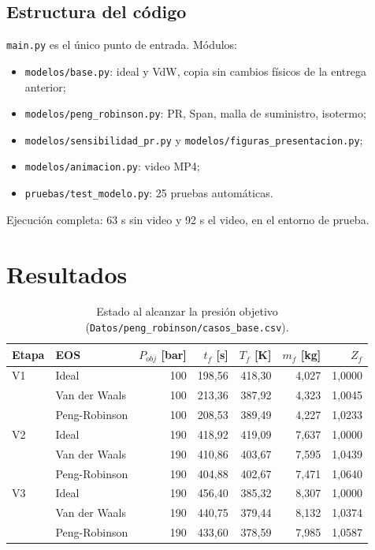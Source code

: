 \documentclass[11pt]{article}
\begin{document}
\subsection{Estructura del código}
\texttt{main.py} es el único punto de entrada. Módulos:
\begin{itemize}
\item \texttt{modelos/base.py}: ideal y VdW, copia sin cambios físicos de la entrega anterior;
\item \texttt{modelos/peng\_robinson.py}: PR, Span, malla de suministro, isotermo;
\item \texttt{modelos/sensibilidad\_pr.py} y \texttt{modelos/figuras\_presentacion.py};
\item \texttt{modelos/animacion.py}: video MP4;
\item \texttt{pruebas/test\_modelo.py}: 25 pruebas automáticas.
\end{itemize}
Ejecución completa: 63 s sin video y 92 s el video, en el entorno de prueba.

\section{Resultados}
\begin{table}[h]\centering\small
\begin{tabular}{llrrrrr}\toprule
Etapa & EOS & $P_{obj}$ [bar] & $t_f$ [s] & $T_f$ [K] & $m_f$ [kg] & $Z_f$\\\midrule
V1 & Ideal & 100 & 198,56 & 418,30 & 4,027 & 1,0000\\
 & Van der Waals & 100 & 213,36 & 387,92 & 4,323 & 1,0045\\
 & Peng-Robinson & 100 & 208,53 & 389,49 & 4,227 & 1,0233\\
V2 & Ideal & 190 & 418,92 & 419,09 & 7,637 & 1,0000\\
 & Van der Waals & 190 & 410,86 & 403,67 & 7,595 & 1,0439\\
 & Peng-Robinson & 190 & 404,88 & 402,67 & 7,471 & 1,0640\\
V3 & Ideal & 190 & 456,40 & 385,32 & 8,307 & 1,0000\\
 & Van der Waals & 190 & 440,75 & 379,44 & 8,132 & 1,0374\\
 & Peng-Robinson & 190 & 433,60 & 378,59 & 7,985 & 1,0587\\\bottomrule
\end{tabular}
\caption{Estado al alcanzar la presión objetivo (\texttt{Datos/peng\_robinson/casos\_base.csv}).}
\end{table}
\end{document}
